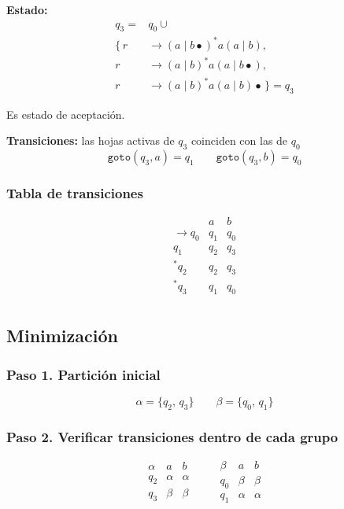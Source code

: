\documentclass[12pt,letterpaper]{article}
\begin{document}
\begin{enumerate}[label=\arabic*.]
\begin{enumerate}
  \medskip
  
  \textbf{Estado:}
  \[
  \begin{aligned}
    q_3 = &q_0 \cup\\
    \{\,
    r &\to(a\mid b\bullet)^*a(a\mid b),\\
    r &\to(a\mid b)^*a(a\mid b\bullet),\\
    r &\to(a\mid b)^*a(a\mid b)\bullet
    \,\} = \boxed{q_3}
  \end{aligned}
  \]

  Es estado de aceptación.

  \textbf{Transiciones:} las hojas activas de $q_3$ coinciden con las de $q_0$
  \[
  \texttt{goto}(q_3, a) = q_1
  \qquad
  \texttt{goto}(q_3, b) = q_0
  \]
  
  \bigskip
  
  \subsubsection*{Tabla de transiciones}
  \[
  \begin{array}{c|cc}
    & a & b \\ \hline
    \rightarrow q_0 & q_1 & q_0 \\
    q_1 & q_2 & q_3  \\
    {}^*q_2 & q_2 & q_3 \\
    {}^*q_3 & q_1 & q_0 \\
  \end{array}
  \]

  \medskip

  \subsection*{Minimización}

  \subsubsection*{Paso 1. Partición inicial}
  \[
  \alpha = \{q_2,\, q_3\} \qquad \beta = \{q_0,\, q_1\}
  \]

  \subsubsection*{Paso 2. Verificar transiciones dentro de cada grupo}
  \[
  \begin{array}{c|cc}
    \alpha & a & b \\ \hline
    q_2 & \alpha & \alpha \\
    q_3 & \beta & \beta
  \end{array}
  \qquad
  \begin{array}{c|cc}
    \beta & a & b \\ \hline
    q_0 & \beta & \beta \\
    q_1 & \alpha & \alpha
  \end{array}
  \]


\end{enumerate}
\end{enumerate}
\end{document}
